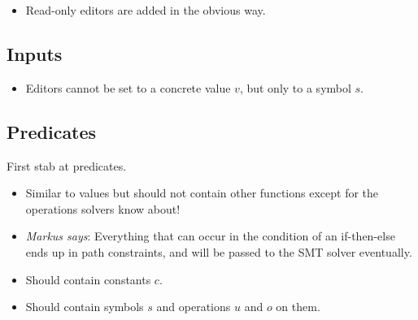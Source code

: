 \begin{itemize}
  \item Read-only editors are added in the obvious way.
\end{itemize}



\subsection{Inputs}


\begin{itemize}
  \item Editors cannot be set to a concrete value $v$, but only to a symbol $s$.
\end{itemize}



\subsection{Predicates}


First stab at predicates.
\begin{itemize}
  \item Similar to values but should not contain other functions except for the operations \SMT solvers know about!
  \item \emph{Markus says}: Everything that can occur in the condition of an if-then-else ends up in path constraints, and will be passed to the SMT solver eventually.
  \item Should contain constants $c$.
  \item Should contain symbols $s$ and operations $u$ and $o$ on them.
\end{itemize}
